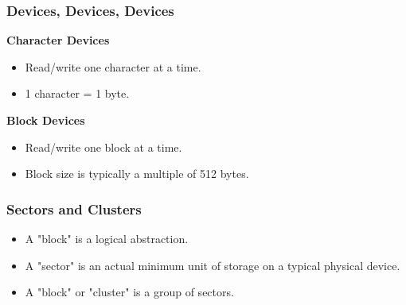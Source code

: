 \begin{frame}

\frametitle{Devices, Devices, Devices}



\begin{center}

\large \textbf{Character Devices}

\end{center}

\begin{itemize}

\item Read/write one character at a time.

\item 1 character = 1 byte.

\end{itemize}



\vspace{\fill}

\begin{center}

\large \textbf{Block Devices}

\end{center}

\begin{itemize}

\item Read/write one block at a time.

\item Block size is typically a multiple of 512 bytes.

\end{itemize}



\end{frame}



\begin{frame}

\frametitle{Sectors and Clusters}


\begin{itemize}

\item A "block" is a logical abstraction.

\item A "sector" is an actual minimum unit of storage on a typical physical device.

\item A "block" or "cluster" is a group of sectors.

\end{itemize}

\end{frame}

